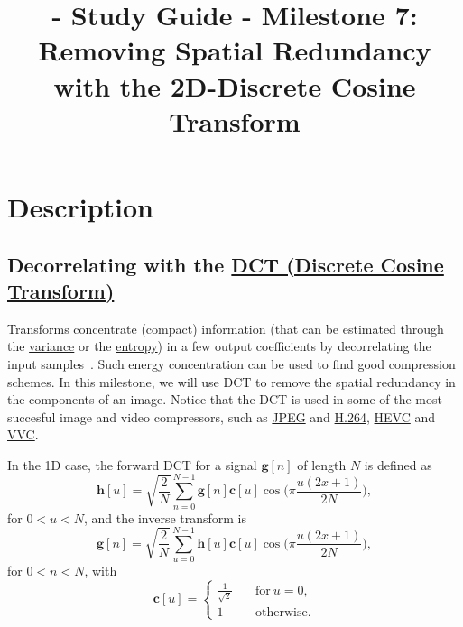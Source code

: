 
\title{\SM{} - Study Guide - Milestone 7: Removing Spatial Redundancy with the 2D-Discrete Cosine Transform}

\maketitle

\tableofcontents

\section{Description}

\subsection{Decorrelating with the \href{https://en.wikipedia.org/wiki/Discrete_cosine_transform}{DCT
(Discrete Cosine Transform)}}

Transforms concentrate (compact) information (that can be estimated
through the \href{https://en.wikipedia.org/wiki/Variance}{variance} or
the \href{https://en.wikipedia.org/wiki/Entropy}{entropy}) in a few
output coefficients by decorrelating the input
samples~\cite{sayood2017introduction}. Such energy concentration can
be used to find good compression schemes. In this milestone, we will
use DCT to remove the spatial redundancy in the components of an
image. Notice that the DCT is used in some of the most succesful image and
video compressors, such as
\href{https://en.wikipedia.org/wiki/JPEG}{JPEG} and
\href{https://en.wikipedia.org/wiki/Advanced_Video_Coding}{H.264},
\href{https://en.wikipedia.org/wiki/Advanced_Video_Coding}{HEVC} and
\href{https://en.wikipedia.org/wiki/Versatile_Video_Coding}{VVC}.

In the 1D case, the forward DCT for a signal $\mathbf{g}[n]$ of
length $N$ is defined as~\cite{burger2016digital}
\begin{equation}
  {\mathbf h}[u] = \sqrt{\frac{2}{N}}\sum_{n=0}^{N-1}{\mathbf
    g}[n]{\mathbf c}[u]\cos\Big(\pi\frac{u(2x+1)}{2N}\Big),
\end{equation}
for $0<u<N$, and the inverse transform is
\begin{equation}
  {\mathbf g}[n] = \sqrt{\frac{2}{N}}\sum_{u=0}^{N-1}{\mathbf
    h}[u]{\mathbf c}[u]\cos\Big(\pi\frac{u(2x+1)}{2N}\Big),
\end{equation}
for $0<n<N$, with
\begin{equation}
  {\mathbf c}[u] = \left\{
  \begin{array}{ll}
    \frac{1}{\sqrt{2}} & \quad \text{for}~u=0, \\
    1 & \quad \text{otherwise}.
  \end{array}
  \right.
\end{equation}

